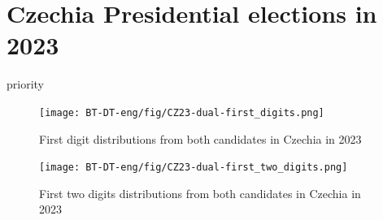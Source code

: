 \section{Czechia Presidential elections in 2023}
priority 








\begin{figure}[h]
    \centering
    \caption{First digit distributions from both candidates in Czechia in 2023}
    \texttt{[image: BT-DT-eng/fig/CZ23-dual-first\_digits.png]}
    \label{fig:CZ23-dual-first_digits}
\end{figure}


\begin{figure}[h]
    \centering
    \caption{First two digits distributions from both candidates in Czechia in 2023}
    \texttt{[image: BT-DT-eng/fig/CZ23-dual-first\_two\_digits.png]}
    \label{fig:CZ23-dual-first_two_digits}
\end{figure}

